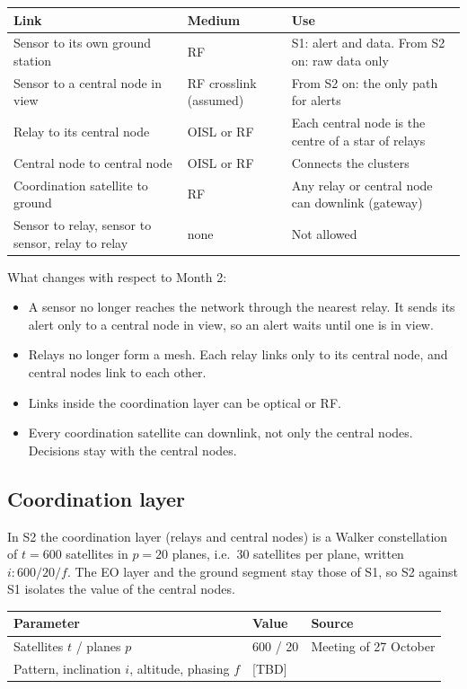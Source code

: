 \documentclass[11pt]{article}
\begin{document}
\begin{longtable}{|p{5.2cm}|p{3.0cm}|p{6.6cm}|}
\hline
\rowcolor{tablehead}
\textbf{Link} & \textbf{Medium} & \textbf{Use} \\
\hline
\endhead
Sensor to its own ground station & RF & S1: alert and data. From S2 on: raw data only \\
\hline
Sensor to a central node in view & RF crosslink (assumed) & From S2 on: the only path for alerts \\
\hline
Relay to its central node & OISL or RF & Each central node is the centre of a star of relays \\
\hline
Central node to central node & OISL or RF & Connects the clusters \\
\hline
Coordination satellite to ground & RF & Any relay or central node can downlink (gateway) \\
\hline
Sensor to relay, sensor to sensor, relay to relay & none & Not allowed \\
\hline
\end{longtable}

What changes with respect to Month 2:
\begin{itemize}[leftmargin=1.2cm]
    \item A sensor no longer reaches the network through the nearest relay. It sends its alert only to a central node in view, so an alert waits until one is in view.
    \item Relays no longer form a mesh. Each relay links only to its central node, and central nodes link to each other.
    \item Links inside the coordination layer can be optical or RF.
    \item Every coordination satellite can downlink, not only the central nodes. Decisions stay with the central nodes.
\end{itemize}

\subsection{Coordination layer}

In S2 the coordination layer (relays and central nodes) is a Walker constellation~\cite{walker1984} of $t = 600$ satellites in $p = 20$ planes, i.e.\ 30 satellites per plane, written $i\!:\!600/20/f$. The EO layer and the ground segment stay those of S1, so S2 against S1 isolates the value of the central nodes.

\begin{longtable}{|p{4.0cm}|p{2.5cm}|p{6.0cm}|}
\hline
\rowcolor{tablehead}
\textbf{Parameter} & \textbf{Value} & \textbf{Source} \\
\hline
\endhead
Satellites $t$ / planes $p$ & 600 / 20 & Meeting of 27 October \\
\hline
Pattern, inclination $i$, altitude, phasing $f$ & [TBD] & \\
\hline
\end{longtable}
\end{document}
